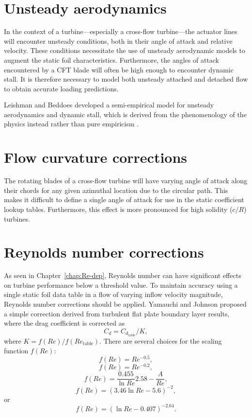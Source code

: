 \section{Unsteady aerodynamics}

In the context of a turbine---especially a cross-flow turbine---the actuator
lines will encounter unsteady conditions, both in their angle of attack and
relative velocity. These conditions necessitate the use of unsteady aerodynamic
models to augment the static foil characteristics. Furthermore, the angles of
attack encountered by a CFT blade will often be high enough to encounter dynamic
stall. It is therefore necessary to model both unsteady attached and detached
flow to obtain accurate loading predictions.

Leishman and Beddoes developed a semi-empirical model for unsteady aerodynamics
and dynamic stall, which is derived from the phenomenology of the physics
instead rather than pure empiricism \cite{Leishman1989}.

\section{Flow curvature corrections}

The rotating blades of a cross-flow turbine will have varying angle of attack
along their chords for any given azimuthal location due to the circular path.
This makes it difficult to define a single angle of attack for use in the static
coefficient lookup tables. Furthermore, this effect is more pronounced for high
solidity ($c/R$) turbines.


\section{Reynolds number corrections}

As seen in Chapter~\ref{chap:Re-dep}, Reynolds number can have significant
effects on turbine performance below a threshold value. To maintain accuracy
using a single static foil data table in a flow of varying inflow velocity
magnitude, Reynolds number corrections should be applied. Yamauchi and Johnson
\cite{Yamauchi1983} proposed a simple correction derived from turbulent flat
plate boundary layer results, where the drag coefficient is corrected as
\begin{equation}
C_d = C_{d_{\mathrm{table}}}/ K,
\label{eq:cd-correction}
\end{equation}
where $K = f(Re)/f(Re_\mathrm{table})$. There are several choices for the
scaling function $f(Re)$:
\begin{equation}
f(Re) = Re^{-0.5},
\end{equation}
\begin{equation}
f(Re) = Re^{-0.2},
\end{equation}
\begin{equation}
f(Re) = \frac{0.455}{\ln Re}2.58 - \frac{A}{Re},
\end{equation}
\begin{equation}
f(Re) = (3.46 \ln Re - 5.6)^{-2},
\end{equation}
or
\begin{equation}
f(Re) = (\ln Re - 0.407)^{-2.64}.
\end{equation}

